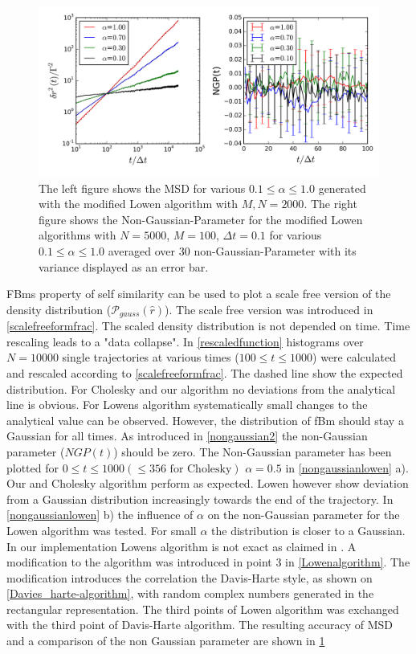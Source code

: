 \documentclass[
  a4paper,BCOR10mm,oneside,
  headsepline,footsepline,%
  fleqn,openbib
]{scrbook}
\begin{document}
\begin{figure}[h]
\centering
\includegraphics[width=\textwidth]{./data/nongaussianlowenalphaneumodifed.png}
\caption{The left figure shows the MSD for various $0.1\leq\alpha\leq1.0$ generated with the modified Lowen algorithm with $M,N=2000$.\newline
The right figure shows the  Non-Gaussian-Parameter for the modified Lowen algorithms with  $N=5000$, $M=100$, $\Delta t = 0.1$ for various $0.1\leq\alpha\leq1.0$ averaged over $30$ non-Gaussian-Parameter with its variance displayed as an error bar.}
\label{nongaussianlowenmodif}
\end{figure}
FBms property of self similarity can be used to plot a scale free version of the density distribution ($\mathcal{P}_{gauss}(\hat{r})$). The scale free version was introduced in \cref{scalefreeformfrac}. The scaled density distribution is not depended on time. Time rescaling leads to a "data collapse". In \cref{rescaledfunction}  histograms over $N=10000$ single trajectories at various times ($100\leq t \leq 1000$) were calculated and rescaled according to \cref{scalefreeformfrac}. The dashed line show the expected distribution. For Cholesky and our algorithm no deviations from the analytical line is obvious. For Lowens algorithm systematically small changes to the analytical value can be observed. However, the distribution of fBm should stay a Gaussian for all times. As introduced in \cref{nongaussian2} the non-Gaussian parameter ($NGP(t)$) should be zero. The Non-Gaussian parameter has been plotted for $0 \leq t \leq 1000 (\leq 356 \text{ for Cholesky})$  $\alpha=0.5$  in \cref{nongaussianlowen} a). Our and Cholesky algorithm perform as expected. Lowen however show deviation from a Gaussian distribution increasingly towards the end of the trajectory. In  \cref{nongaussianlowen} b) the influence of $\alpha$ on the non-Gaussian parameter for the Lowen algorithm was tested. For small $\alpha$ the distribution is closer to a Gaussian. In our implementation Lowens algorithm is not exact as claimed in \cite{Lowen1999}. A modification to the algorithm  was introduced in point 3 in \cref{Lowenalgorithm}. The modification introduces the correlation the Davis-Harte style, as shown on \cref{Davies_harte-algorithm}, with random complex numbers generated in the rectangular representation. The third points of Lowen algorithm was exchanged with the third point of Davis-Harte algorithm. The resulting accuracy of MSD and a comparison of the non Gaussian parameter are shown in \cref{nongaussianlowenmodif}
\end{document}
